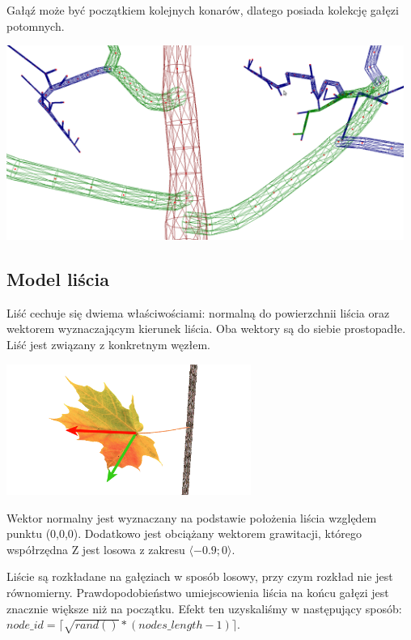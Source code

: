 Gałąź może być początkiem kolejnych konarów, dlatego posiada kolekcję gałęzi potomnych.

\begin{center}
	\includegraphics[width=130mm]{images/model/branching.png}
	\label{branching}
\end{center}
\subsection{Model liścia}
Liść cechuje się dwiema właściwościami: normalną do powierzchnii liścia oraz wektorem wyznaczającym kierunek liścia. Oba wektory są do siebie prostopadłe. Liść jest związany z konkretnym węzłem.

\begin{center}
	\includegraphics[width=80mm]{images/model/leaf_vects.png}
	\label{leaf_vect}
\end{center}

Wektor normalny jest wyznaczany na podstawie położenia liścia względem punktu (0,0,0). Dodatkowo jest obciążany wektorem grawitacji, którego współrzędna Z jest losowa z zakresu $\langle-0.9;0\rangle$. 



Liście są rozkładane na gałęziach w sposób losowy, przy czym rozkład nie jest równomierny. Prawdopodobieństwo umiejscowienia liścia na końcu gałęzi jest znacznie większe niż na początku. Efekt ten uzyskaliśmy w następujący sposób: $node\_id = \lceil\sqrt{rand()}*(nodes\_length-1)\rceil$.

